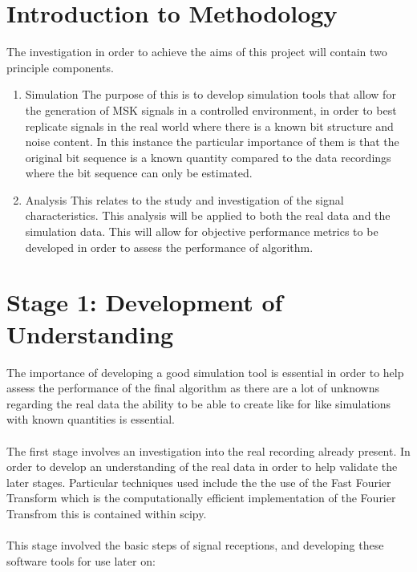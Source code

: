 \section{Introduction to Methodology}
The investigation in order to achieve the aims of this project will contain two principle components. 
\begin{enumerate}
    \item Simulation
    The purpose of this is to develop simulation tools that allow for the generation of MSK signals in a controlled environment, in order to best replicate signals in the real world where there is a known bit structure and noise content. In this instance the particular importance of them is that the original bit sequence is a known quantity compared to the data recordings where the bit sequence can only be estimated. 
    
    \item Analysis
    This relates to the study and investigation of the signal characteristics. This analysis will be applied to both the real data and the simulation data. This will allow for objective performance metrics to be developed in order to assess the performance of algorithm.
\end{enumerate}


\section{Stage 1: Development of Understanding} 
The importance of developing a good simulation tool is essential in order to help assess the performance of the final algorithm as there are a lot of unknowns regarding the real data the ability to be able to create like for like simulations with known quantities is essential.
\\\\
The first stage involves an investigation into the real recording already present. In order to develop an understanding of the real data in order to help validate the later stages. Particular techniques used include the the use of the Fast Fourier Transform which is the computationally efficient implementation of the Fourier Transfrom this is contained within scipy.
\\\\
This stage involved the basic steps of signal receptions, and developing these software tools for use later on:

